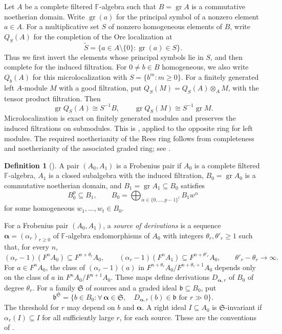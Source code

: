 \documentclass[11pt]{article}
\numberwithin{equation}{section}
\theoremstyle{definition}
\newtheorem{definition}[theorem]{Definition}
\theoremstyle{remark}
\newcommand{\F}{\mathbb F}
\DeclareMathOperator{\gr}{gr}
\begin{document}
Let $A$ be a complete filtered $\F$-algebra such that
$B=\gr A$ is a commutative noetherian domain.
Write $\gr(a)$ for the principal symbol of a nonzero element
$a\in A$. For a multiplicative set $S$ of nonzero homogeneous
elements of $B$, write $Q_S(A)$ for the completion of the
Ore localization at
\[
 \widetilde S=\{a\in A\setminus\{0\}:\gr(a)\in S\}.
\]
Thus we first invert the elements whose principal symbols lie in
$S$, and then complete for the induced filtration.
For $0\ne b\in B$ homogeneous, we also write $Q_b(A)$ for
this microlocalization with $S=\{b^m:m\geq0\}$.
For a finitely generated left $A$-module $M$ with a good filtration, put
$Q_S(M)=Q_S(A)\otimes_{A}M$, with the tensor product filtration.
Then
\begin{equation}\label{eq:microlocalization}
 \gr Q_S(A)\cong S^{-1}B,\qquad
 \gr Q_S(M)\cong S^{-1}\gr M.
\end{equation}
Microlocalization is exact on finitely generated modules and preserves
the induced filtrations on submodules. This is
\cite[Prop.~4.3 and Lemma~4.4]{AWZ08}, applied to the opposite ring
for left modules. The required noetherianity of the Rees ring follows
from completeness and noetherianity of the associated graded ring;
see \cite[Prop.~II.2.2.1]{LvO96}.

\begin{definition}[{\cite[Def.~2.2]{AWZ08}}]\label{def:frobenius-pair}
A pair $(A_0,A_1)$ is a Frobenius pair if $A_0$ is a complete filtered
$\F$-algebra, $A_1$ is a closed subalgebra with the induced filtration,
$B_0=\gr A_0$ is a commutative noetherian domain, and
$B_1=\gr A_1\subseteq B_0$ satisfies
\[
 B_0^p\subseteq B_1,\qquad
 B_0=\bigoplus_{\alpha\in\{0,\ldots,p-1\}^t}B_1w^\alpha
\]
for some homogeneous $w_1,\ldots,w_t\in B_0$.
\end{definition}

For a Frobenius pair $(A_0,A_1)$, a \emph{source of derivations} is a
sequence $\boldsymbol\alpha=(\alpha_r)_{r\geq0}$ of
$\F$-algebra endomorphisms of $A_0$ with integers
$\theta_r,\theta'_r\geq1$ such that, for every $n$,
\begin{equation}\label{eq:source-shifts}
 (\alpha_r-1)(F^nA_0)\subseteq F^{n+\theta_r}A_0,\qquad
 (\alpha_r-1)(F^nA_1)\subseteq F^{n+\theta'_r}A_0,
 \qquad \theta'_r-\theta_r\longrightarrow\infty.
\end{equation}
For $a\in F^nA_0$, the class of $(\alpha_r-1)(a)$ in
$F^{n+\theta_r}A_0/F^{n+\theta_r+1}A_0$ depends only on the class
of $a$ in $F^nA_0/F^{n+1}A_0$. These maps define derivations
$D_{\boldsymbol\alpha,r}$ of $B_0$ of degree $\theta_r$.
For a family $\mathfrak S$ of sources and a graded ideal
$\mathfrak b\subseteq B_0$, put
\[
 \mathfrak b^{\mathfrak S}=\{b\in B_0:
 \forall\,\boldsymbol\alpha\in\mathfrak S,\quad
 D_{\boldsymbol\alpha,r}(b)\in\mathfrak b\text{ for }r\gg0\}.
\]
The threshold for $r$ may depend on $b$ and $\boldsymbol\alpha$.
A right ideal $I\subseteq A_0$ is $\mathfrak S$-invariant if
$\alpha_r(I)\subseteq I$ for all sufficiently large $r$, for each
source. These are the conventions of \cite[\S\S~3.1--3.4]{AW09}.
\end{document}
